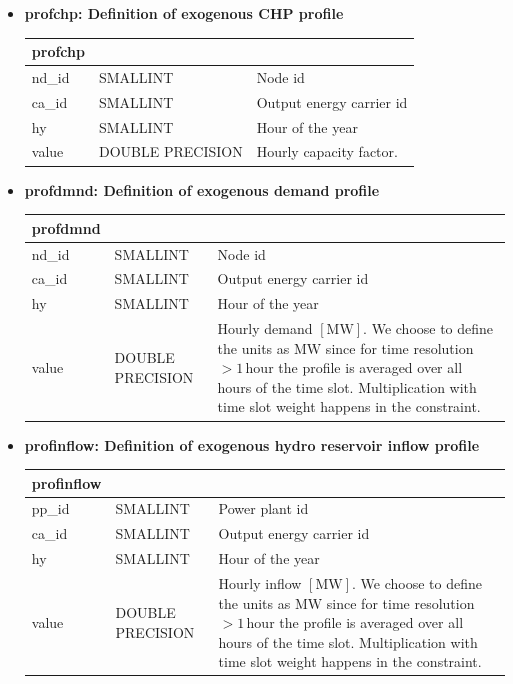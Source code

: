 \documentclass[]{article}
\begin{document}
\begin{itemize}
\item \textbf{profchp: Definition of exogenous CHP profile}

\begin{tabular}{@{}lll@{}}
\toprule
profchp & & \\
\midrule
nd\_id & SMALLINT & Node id \\
ca\_id & SMALLINT & Output energy carrier id \\
hy & SMALLINT & Hour of the year \\
value & DOUBLE PRECISION & Hourly capacity factor. \\
\bottomrule
\end{tabular}

\item \textbf{profdmnd: Definition of exogenous demand profile}

\begin{tabular}{@{}llp{10cm}@{}}
\toprule
profdmnd & & \\
\midrule
nd\_id & SMALLINT & Node id \\
ca\_id & SMALLINT & Output energy carrier id \\
hy & SMALLINT & Hour of the year \\
value & DOUBLE PRECISION & Hourly demand $[\mathrm{MW}]$. We choose to define the units as $\mathrm{MW}$ since for time resolution $>1\,\mathrm{hour}$ the profile is averaged over all hours of the time slot. Multiplication with time slot weight happens in the constraint.\\
\bottomrule
\end{tabular}

\item \textbf{profinflow: Definition of exogenous hydro reservoir inflow profile}

\begin{tabular}{@{}llp{10cm}@{}}
\toprule
profinflow & & \\
\midrule
pp\_id & SMALLINT & Power plant id \\
ca\_id & SMALLINT & Output energy carrier id \\
hy & SMALLINT & Hour of the year \\
value & DOUBLE PRECISION & Hourly inflow $[\mathrm{MW}]$. We choose to define the units as $\mathrm{MW}$ since for time resolution $>1\,\mathrm{hour}$ the profile is averaged over all hours of the time slot. Multiplication with time slot weight happens in the constraint. \\
\bottomrule
\end{tabular}


\end{itemize}
\end{document}

